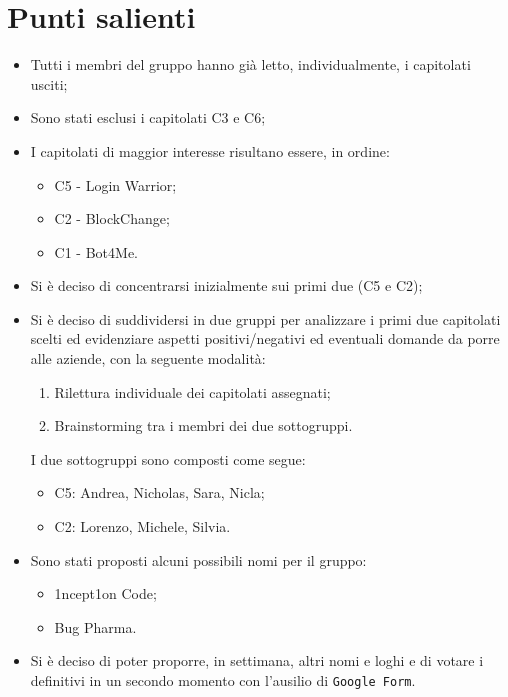 \documentclass[11pt]{article}
\begin{document}
	\newpage
	
	\section{Punti salienti}
		\begin{itemize}
			\item Tutti i membri del gruppo hanno già letto, individualmente, i capitolati usciti;
			\item Sono stati esclusi i capitolati C3 e C6;
			\item I capitolati di maggior interesse risultano essere, in ordine:
			\begin{itemize}
				\item C5 - Login Warrior;
				\item C2 - BlockChange;
				\item C1 - Bot4Me.
			\end{itemize}
			\item Si è deciso di concentrarsi inizialmente sui primi due (C5 e C2);
			\item Si è deciso di suddividersi in due gruppi per analizzare i primi due capitolati scelti ed evidenziare
			aspetti positivi/negativi ed eventuali domande da porre alle aziende, con la seguente modalità:
			\begin{enumerate}
				\item Rilettura individuale dei capitolati assegnati;
				\item Brainstorming tra i membri dei due sottogruppi.
			\end{enumerate}
			I due sottogruppi sono composti come segue:
			\begin{itemize}
				\item C5: Andrea, Nicholas, Sara, Nicla;
				\item C2: Lorenzo, Michele, Silvia.
			\end{itemize}
			
			\item Sono stati proposti alcuni possibili nomi per il gruppo:
				\begin{itemize}
					\item 1ncept1on Code;
					\item Bug Pharma.
				\end{itemize}
			\item Si è deciso di poter proporre, in settimana, altri nomi e loghi e di votare i definitivi in un secondo momento
			con l'ausilio di \texttt{Google Form}.
		\end{itemize}	
\end{document}
